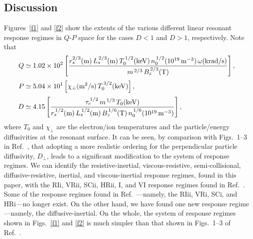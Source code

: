 \documentclass[12pt,prb,aps]{revtex4-1}
\begin{document}
\subsection{Discussion}\label{dis1}
Figures~\ref{f1} and \ref{f2} show the extents of the various different linear resonant response regimes in $Q$-$P$ space for the
cases $D<1$ and $D>1$, respectively. Note that
\begin{align}
Q&\simeq 1.02\times 10^2\left[\frac{r_s^{2/3}({\rm m})\,L_s^{\,2/3}({\rm m})\,T_0^{\,1/2}({\rm keV})\,n_0^{\,1/2}(10^{19}\,{\rm m}^{-3})\,\omega({\rm krad/s})}{m^{\,2/3}\,B_z^{\,2/3}({\rm T})}\right],\label{e73}\\[0.5ex]
P&\simeq 5.04\times 10^1\left[\chi_\perp({\rm m^2/s})\,T_0^{\,3/2}({\rm keV})\right],\\[0.5ex]
D&\simeq 4.15\left[\frac{\tau_e^{\,1/2}\,m^{\,1/3}\,T_0({\rm keV})}{r_s^{\,1/2}({\rm m})\,L_s^{\,1/2}({\rm m})\,B_z^{\,1/6}({\rm T})\,n_0^{\,1/6}(10^{19}\,{\rm m}^{-3})}\right],
\end{align}
where $T_0$ and $\chi_\perp$ are the electron/ion temperatures and the particle/energy diffusivities at the resonant
surface.
 It can be seen, by comparison with Figs.~1--3 in Ref.~, that
adopting a more realistic ordering for the perpendicular particle diffusivity, $D_\perp$, leads to a significant
modification to the system of response regimes. We can identify the
resistive-inertial, viscous-resistive, semi-collisional, diffusive-resistive, inertial, and viscous-inertial response regimes, found in this paper, with
the RIi, VRii, SCii, HRii, I, and VI response regimes found in Ref.~. Some of the response regimes
found in Ref.~---namely, the RIii, VRi, SCi, and HRi---no longer exist. On the other hand, we have
found one new response regime---namely, the diffusive-inertial. On the whole, the system of response regimes shown
in Figs.~\ref{f1} and \ref{f2} is much simpler than that shown in Figs.~1--3 of Ref.~.
\end{document}
